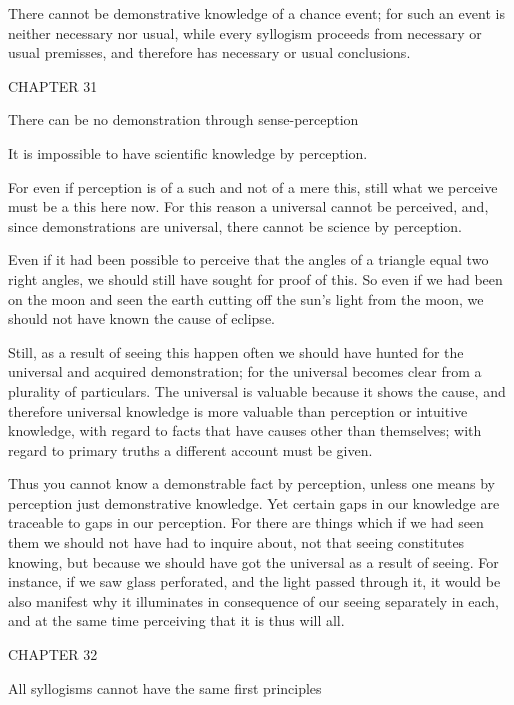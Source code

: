 There cannot be demonstrative knowledge of a chance event;
for such an event is neither necessary nor usual,
while every syllogism proceeds from necessary or usual premisses, and
therefore has necessary or usual conclusions.

CHAPTER 31

There can be no demonstration through sense-perception

It is impossible to have scientific knowledge by perception.

For even if perception is of a such and not of a mere this,
still what we perceive must be a this here now.
For this reason a universal cannot be perceived, and,
since demonstrations are universal, there cannot be science by perception.

    Even if it had been possible to perceive that
    the angles of a triangle equal two right angles,
    we should still have sought for proof of this.
    So even if we had been on the moon and seen
    the earth cutting off the sun's light from the moon,
    we should not have known the cause of eclipse.

    Still, as a result of seeing this happen often we should
    have hunted for the universal and acquired demonstration;
    for the universal becomes clear from a plurality of particulars.
    The universal is valuable because it shows the cause, and
    therefore universal knowledge is more valuable than
    perception or intuitive knowledge,
    with regard to facts that have causes other than themselves;
    with regard to primary truths a different account must be given.

    Thus you cannot know a demonstrable fact by perception,
    unless one means by perception just demonstrative knowledge.
    Yet certain gaps in our knowledge are traceable to gaps in our perception.
    For there are things which if we had seen them we
    should not have had to inquire about,
    not that seeing constitutes knowing,
    but because we should have got the universal as a result of seeing.
    For instance, if we saw glass perforated, and the light
    passed through it, it would be also manifest why it illuminates
    in consequence of our seeing separately in each,
    and at the same time perceiving that it is thus will all.

CHAPTER 32

All syllogisms cannot have the same first principles


